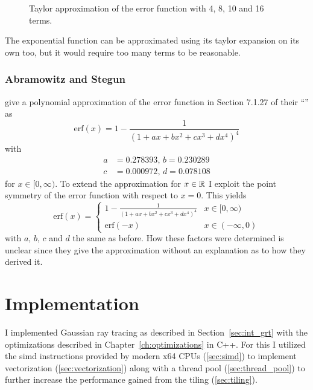 \documentclass[a4paper, 11pt]{memoir}
\newcommand*{\erf}{\text{erf}}
\begin{document}
    \begin{figure}[t]
        \centering
        
        \caption{Taylor approximation of the error function with 4, 8, 10 and 16 terms.}
        \label{fig:taylor_erf}
    \end{figure}

    The exponential function can be approximated using its taylor expansion on its own too, but it would require too
    many terms to be reasonable.

    \subsection{Abramowitz and Stegun}
    \label{sec:abrasteg}
    \citeauthor{AbraSteg72} give a polynomial approximation of the error function in Section 7.1.27 of their
    \enquote{}\cite{AbraSteg72} as
    \begin{equation}
        \erf{(x)} = 1 - \frac{1}{(1 + ax + bx^2 + cx^3 + dx^4)^4}
        \label{eq:abrasteg_positive}
    \end{equation}
    with
    \begin{equation}
        \begin{aligned}
            a &= 0.278393,\,
            b = 0.230289\\
            c &= 0.000972,\,
            d = 0.078108
        \end{aligned}
        \label{eq:abrasteg_defs}
    \end{equation}
    for $x \in [0, \infty)$. To extend the approximation for $x \in \mathbb{R}$ I exploit the point symmetry of the error function
    with respect to $x = 0$. This yields
    \begin{equation}
        \erf{(x)} = \begin{cases}
            1 - \frac{1}{(1 + ax + bx^2 + cx^3 + dx^4)^4} & x \in [0, \infty)\\
            \erf{(-x)} & x \in (-\infty, 0)
        \end{cases}
        \label{eq:abrasteg}
    \end{equation}
    with $a$, $b$, $c$ and $d$ the same as before. How these factors were determined is unclear since they give the
    approximation without an explanation as to how they derived it.
    
    \chapter{Implementation}
    \label{ch:implementation}
    I implemented Gaussian ray tracing as described in Section~\ref{sec:int_grt} with the optimizations described in
    Chapter~\ref{ch:optimizations} in C++. For this I utilized the \gls{simd} instructions provided by modern x64 CPUs
    (\ref{sec:simd}) to implement vectorization (\ref{sec:vectorization}) along with a thread pool
    (\ref{sec:thread_pool}) to further increase the performance gained from the tiling (\ref{sec:tiling}).
\end{document}

